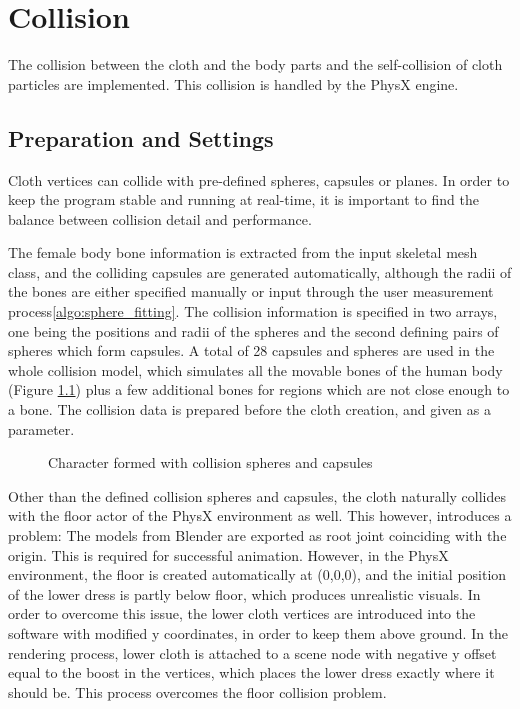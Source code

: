 \chapter{Collision}
\label{chapter_collision}

The collision between the cloth and the body parts and the self-collision of cloth particles are implemented. This collision is handled by the PhysX engine. 

\section{Preparation and Settings}
\label{section_collision_preparation}

Cloth vertices can collide with pre-defined spheres, capsules or planes. In order to keep the program stable and running at real-time, it is important to find the balance 
between collision detail and performance. 

The female body bone information is extracted from the input skeletal mesh class, and the colliding capsules are generated automatically, although the radii of the bones
are either specified manually or input through the user measurement process\ref{algo:sphere_fitting}. The collision information is specified in two arrays, one being the
 positions and radii of the spheres and the second defining pairs of spheres which form capsules. A total of 28 capsules and spheres are used in the whole collision model, 
 which simulates all the movable bones of the human body (Figure \ref{fig:colliding_human_body}) plus a few additional bones for regions which are not close enough to a bone.
  The collision data is prepared before the cloth creation, and given as a parameter. 

\begin{figure}[h]
\centerline{}
\caption{Character formed with collision spheres and capsules}
\label{fig:colliding_human_body}
\end{figure}

Other than the defined collision spheres and capsules, the cloth naturally collides with the floor actor of the PhysX environment as well. This however,
 introduces a problem: The models from Blender are exported as root joint coinciding with the origin. This is required for successful animation.
  However, in the PhysX environment, the floor is created automatically at (0,0,0), and the initial position of the lower dress is partly below floor,
   which produces unrealistic visuals. In order to overcome this issue, the lower cloth vertices are introduced into the software with modified y coordinates, 
   in order to keep them above ground. In the rendering process, lower cloth is attached to a scene node with negative y offset equal to the boost in the vertices, 
   which places the lower dress exactly where it should be. This process overcomes the floor collision problem.

